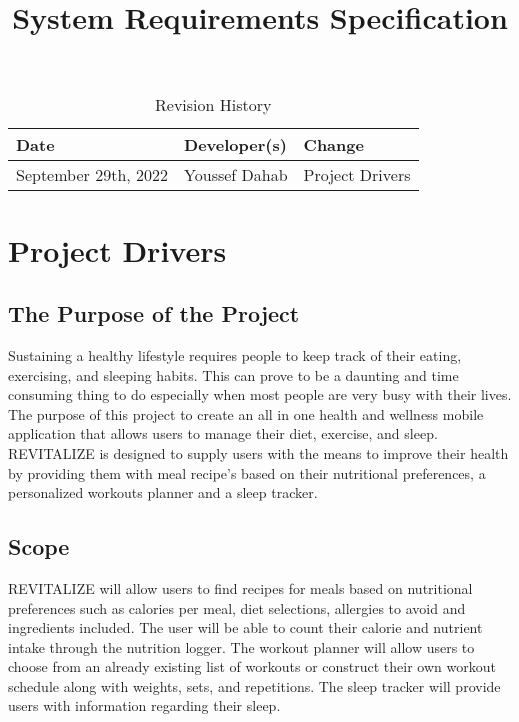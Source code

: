 \documentclass[12pt,letterpaper]{article}
\title{System Requirements Specification\\\progname}
\author{\authname}
\date{}
\begin{document}
\maketitle

\begin{table}[hp]
	\caption{Revision History} \label{TblRevisionHistory}
	\begin{tabularx}{\textwidth}{llX}
		\toprule
		\textbf{Date} & \textbf{Developer(s)} & \textbf{Change}\\
		\midrule
		September 29th, 2022 & Youssef Dahab & Project Drivers \\
		\bottomrule
	\end{tabularx}
\end{table}

\newpage
\tableofcontents
\newpage

\section{Project Drivers}

\subsection{The Purpose of the Project}
Sustaining a healthy lifestyle requires people to keep track of their eating, exercising, and sleeping habits. This can prove to be a daunting and time consuming thing to do especially when most people are very busy with their lives. The purpose of this project to create an all in one health and wellness mobile application that allows users to manage their diet, exercise, and sleep. REVITALIZE is designed to supply users with the means to improve their health by providing them with meal recipe's based on their nutritional preferences, a personalized workouts planner and a sleep tracker. 
\subsection{Scope}
REVITALIZE will allow users to find recipes for meals based on nutritional preferences such as calories per meal, diet selections, allergies to avoid and ingredients included. The user will be able to count their calorie and nutrient intake through the nutrition logger. The workout planner will allow users to choose from an already existing list of workouts or construct their own workout schedule along with weights, sets, and repetitions. The sleep tracker will provide users with information regarding their sleep.
\end{document}
